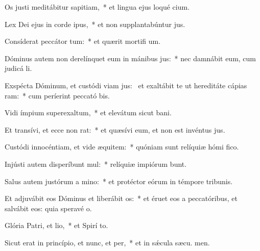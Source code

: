 \item Os justi meditábitur sapitiam,~* et lingua ejus loqué cium.
\item Lex Dei ejus in corde ipus,~* et non supplantabúntur  jus.
\item Consíderat peccátor tum:~* et quærit mortifi um.
\item Dóminus autem non derelínquet eum in mánibus jus:~* nec damnábit eum, cum judicá li.
\item Exspécta Dóminum, et custódi viam jus:~\pscross{} et exaltábit te ut hereditáte cápias ram:~* cum períerint peccató bis.
\item Vidi ímpium superexaltum,~* et elevátum sicut  bani.
\item Et transívi, et ecce non rat:~* et quæsívi eum, et non est invéntus  jus.
\item Custódi innocéntiam, et vide æquitem:~* quóniam sunt relíquiæ hómi fico.
\item Injústi autem disperíbunt mul:~* relíquiæ impiórum bunt.
\item Salus autem justórum a mino:~* et protéctor eórum in témpore tribunis.
\item Et adjuvábit eos Dóminus et liberábit os:~* et éruet eos a peccatóribus, et salvábit eos: quia speravé  o.
\item Glória Patri, et lio,~* et Spirí to.
\item Sicut erat in princípio, et nunc, et per,~* et in sǽcula sæcu. men.
